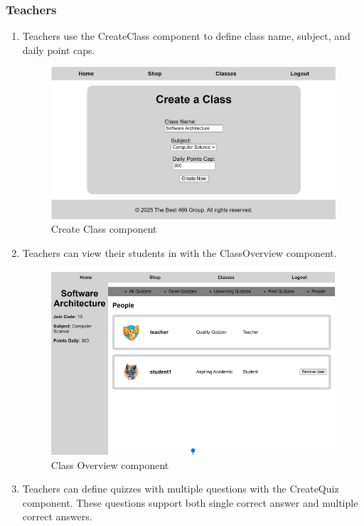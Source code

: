 \subsubsection{Teachers}
\begin{enumerate}
    \item Teachers use the CreateClass component to define class name, subject, and daily point caps.
    \begin{figure}[h]
        \centering
        \includegraphics[width=0.7\linewidth]{PUT INDIVIDUAL SECTIONS HERE/images/createClass.png}
        \caption{Create Class component}
        \label{fig:enter-label}
    \end{figure}
        \item Teachers can view their students in with the ClassOverview component.
    \begin{figure}[H]
        \centering
        \includegraphics[width=0.7\linewidth]{PUT INDIVIDUAL SECTIONS HERE/images/classOverview.png}
        \caption{Class Overview component}
        \label{class-overview}
    \end{figure}
        \item Teachers can define quizzes with multiple questions with the CreateQuiz component. These questions support both single correct answer and multiple correct answers.
    \begin{figure}[H]
        \centering

\end{figure}
\end{enumerate}
